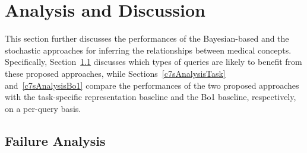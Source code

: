 \documentclass[1p]{elsarticle}
\begin{document}


\section{Analysis and Discussion}\label{c7sAnalysis}
This section further discusses the performances of the Bayesian-based and the stochastic approaches for inferring the relationships between medical concepts. 
Specifically, Section~\ref{c7sFailure} discusses which types of queries are likely to benefit from these proposed approaches, while Sections~\ref{c7sAnalysisTask} and~\ref{c7sAnalysisBo1} compare the performances of the two proposed approaches with the task-specific representation baseline and the Bo1 baseline, respectively, on a per-query basis.

\subsection{Failure Analysis}\label{c7sFailure}
\end{document}
